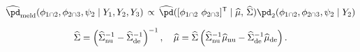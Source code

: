 \begin{equation}
\begin{gathered}
  \widehat{\pd}_{\text{meld}} (\phi_{1 \cap 2}, \phi_{2 \cap 3}, \psi_{2} \mid Y_{1}, Y_{2}, Y_{3})
  \, \propto \,
  \widehat{\pd}([\phi_{1 \cap 2} \,\, \phi_{2 \cap 3}]^{\mathsf{T}} \mid \widehat{\mu}, \, \widehat{\Sigma})
  \pd_{2}(\phi_{1 \cap 2}, \phi_{2 \cap 3}, \psi_{2} \mid Y_{2}) \\[1.5ex] 
  \widehat{\Sigma} = \left(
    \widehat{\Sigma}_{\text{nu}}^{-1} - \widehat{\Sigma}_{\text{de}}^{-1}
  \right)^{-1}, \quad
  \widehat{\mu} = \widehat{\Sigma} \left(
    \widehat{\Sigma}_{\text{nu}}^{-1}\widehat{\mu}_{\text{nu}} - \widehat{\Sigma}_{\text{de}}^{-1}\widehat{\mu}_{\text{de}}
  \right).
\end{gathered}
\label{eqn:final-normal-approx}
\end{equation}